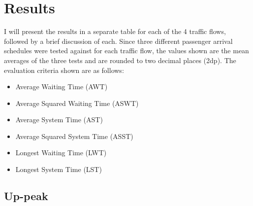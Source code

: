\documentclass{UoYCSproject}
\begin{document}
\section{Results}

I will present the results in a separate table for each of the 4 traffic flows, followed by a brief discussion of each.  Since three different passenger arrival schedules were tested against for each traffic flow, the values shown are the mean averages of the three tests and are rounded to two decimal places (2dp).  The evaluation criteria shown are as follows:
\begin{itemize}
	\item Average Waiting Time (AWT)
	\item Average Squared Waiting Time (ASWT)
	\item Average System Time (AST)
	\item Average Squared System Time (ASST)
	\item Longest Waiting Time (LWT)
	\item Longest System Time (LST)
\end{itemize}

\subsection{Up-peak}
\end{document}
